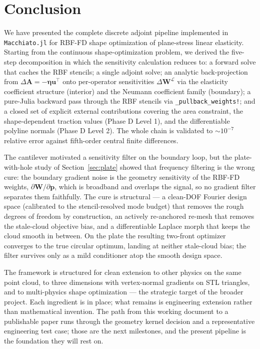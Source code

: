 \documentclass[11pt,a4paper]{article}
\newcommand{\mat}[1]{\mathbf{#1}}
\newcommand{\vect}[1]{\boldsymbol{#1}}
\newcommand{\pts}{\vect{p}}
\begin{document}
\section{Conclusion}

We have presented the complete discrete adjoint pipeline
implemented in \texttt{Macchiato.jl} for RBF-FD shape optimization
of plane-stress linear elasticity. Starting from the continuous
shape-optimization problem, we derived the five-step decomposition
in which the sensitivity calculation reduces to: a forward solve
that caches the RBF stencils; a single adjoint solve; an analytic
back-projection from $\Delta\mat A = -\vect\eta\vect u^\top$ onto
per-operator sensitivities $\Delta\mat W^{\mathcal L}$ via the
elasticity coefficient structure (interior) and the Neumann
coefficient family (boundary); a pure-Julia backward pass through
the RBF stencils via \texttt{\_pullback\_weights!}; and a closed
set of explicit external contributions covering the area
constraint, the shape-dependent traction values (Phase D
Level 1), and the differentiable polyline normals (Phase D
Level 2). The whole chain is validated to $\sim 10^{-7}$ relative
error against fifth-order central finite differences.

The cantilever motivated a sensitivity filter on the boundary loop,
but the plate-with-hole study of Section~\ref{sec:plate} showed that
frequency filtering is the wrong cure: the boundary gradient noise is
the geometry sensitivity of the RBF-FD weights,
$\partial\mat W/\partial\pts$, which is broadband and overlaps the
signal, so no gradient filter separates them faithfully. The cure is
structural --- a clean-DOF Fourier design space (calibrated to the
stencil-resolved mode budget) that removes the rough degrees of freedom
by construction, an actively re-anchored re-mesh that removes the
stale-cloud objective bias, and a differentiable Laplace morph that
keeps the cloud smooth in between. On the plate the resulting two-front
optimizer converges to the true circular optimum, landing at neither
stale-cloud bias; the filter survives only as a mild conditioner atop
the smooth design space.

The framework is structured for clean extension to other physics
on the same point cloud, to three dimensions with vertex-normal
gradients on STL triangles, and to multi-physics shape
optimization --- the strategic target of the broader project.
Each ingredient is in place; what remains is engineering
extension rather than mathematical invention. The path from this
working document to a publishable paper runs through the geometry
kernel decision and a representative engineering test case;
those are the next milestones, and the present pipeline is the
foundation they will rest on.
\end{document}
